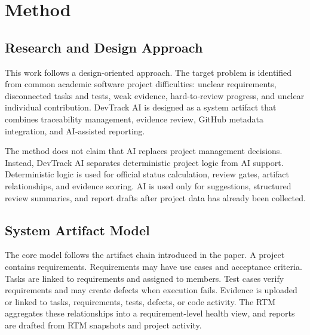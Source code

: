\documentclass[runningheads]{llncs}
\begin{document}
\section{Method}

\subsection{Research and Design Approach}

This work follows a design-oriented approach. The target problem is identified from
common academic software project difficulties: unclear requirements, disconnected
tasks and tests, weak evidence, hard-to-review progress, and unclear individual
contribution. DevTrack AI is designed as a system artifact that combines
traceability management, evidence review, GitHub metadata integration, and
AI-assisted reporting.

The method does not claim that AI replaces project management decisions. Instead,
DevTrack AI separates deterministic project logic from AI support. Deterministic
logic is used for official status calculation, review gates, artifact relationships,
and evidence scoring. AI is used only for suggestions, structured review summaries,
and report drafts after project data has already been collected.

\subsection{System Artifact Model}

The core model follows the artifact chain introduced in the paper. A project contains
requirements. Requirements may have use cases and acceptance criteria. Tasks are
linked to requirements and assigned to members. Test cases verify requirements and
may create defects when execution fails. Evidence is uploaded or linked to tasks,
requirements, tests, defects, or code activity. The RTM aggregates these
relationships into a requirement-level health view, and reports are drafted from RTM
snapshots and project activity.
\end{document}
